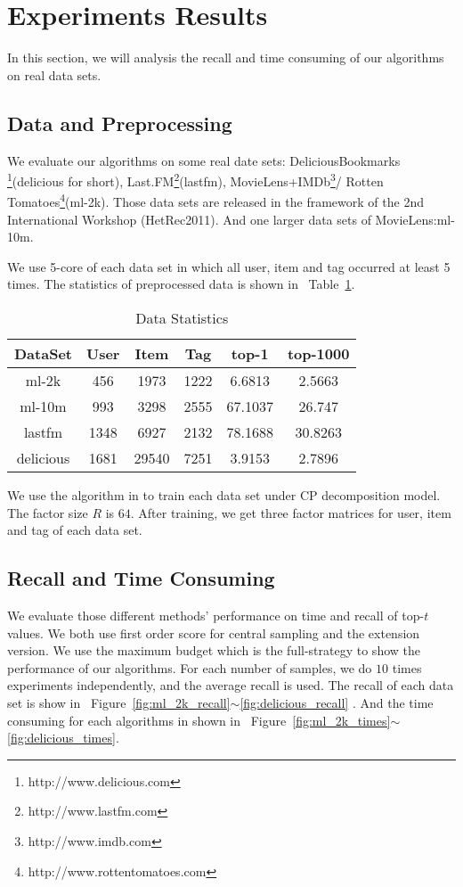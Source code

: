 \documentclass[letterpaper]{article}
\newcommand{\Figs}[2]  {Figure~\ref{fig:#1}$\sim$\ref{fig:#2}}
\newcommand{\Table}[1] {Table~\ref{table:#1}}
\begin{document}
\section{Experiments Results}
In this section, we will analysis the recall
and time consuming of our algorithms on real data sets.

\subsection{Data and Preprocessing}
We evaluate our algorithms on some real date sets:
DeliciousBookmarks
\footnote{http://www.delicious.com}(delicious for short),
Last.FM\footnote{http://www.lastfm.com}(lastfm),
MovieLens+IMDb\footnote{http://www.imdb.com }/
Rotten Tomatoes\footnote{http://www.rottentomatoes.com}(ml-2k).
Those data sets are released in the framework of the 2nd International Workshop (HetRec2011).
And one larger data sets of MovieLens\cite{Harper2015}:ml-10m.

We use 5-core of each data set in which all user, item and tag occurred at least 5 times.
The statistics of preprocessed data is shown in ~\Table{Data}.
\begin{table}[ht]
  \label{table:Data}
  \centering
  \begin{tabular}{|c|c|c|c|c|c|}
    \hline
    DataSet     & User & Item    & Tag    & top-1   & top-1000\\
    \hline
    ml-2k       & 456  &  1973   &  1222  & 6.6813  & 2.5663 \\
    ml-10m      & 993  &  3298   &  2555  & 67.1037 & 26.747 \\
    lastfm      & 1348 &  6927   &  2132  & 78.1688 & 30.8263\\
    delicious   & 1681 &  29540  &  7251  & 3.9153  & 2.7896 \\
    \hline
  \end{tabular}
  \caption{Data Statistics}
\end{table}
We use the algorithm in \cite{Rendle_RTF} to train each data set under CP decomposition model.
The factor size $R$ is $64$.
After training, we get three factor matrices for user, item and tag of each data set.

\subsection{Recall and Time Consuming}
We evaluate those different methods' performance on time and recall of top-$t$ values.
We both use first order score for central sampling and the extension version.
We use the maximum budget which is the full-strategy to show the performance of our algorithms.
For each number of samples, we do $10$ times experiments independently, and the average recall is used.
The recall of each data set is show in ~\Figs{ml_2k_recall}{delicious_recall} .
And the time consuming for each algorithms in shown in ~\Figs{ml_2k_times}{delicious_times}.
\end{document}
